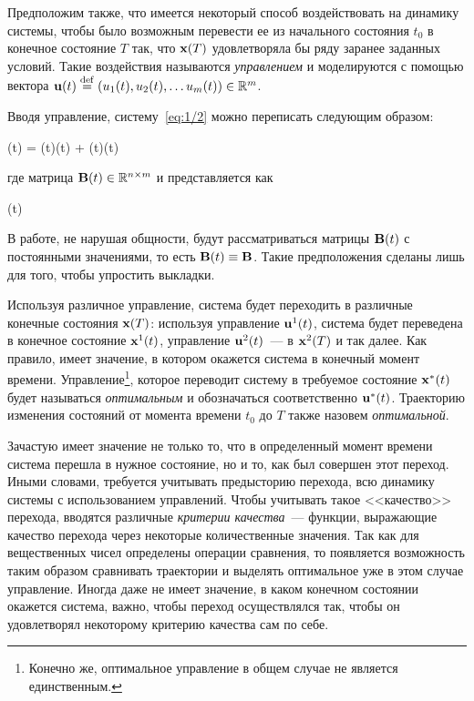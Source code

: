 Предположим также, что имеется некоторый способ воздействовать на динамику системы, чтобы было возможным перевести ее из начального состояния $t_0$ в конечное состояние $T$ так, что $\mathbf{x}(T)$ удовлетворяла бы ряду заранее заданных условий. Такие воздействия называются \emph{управлением} и моделируются с помощью вектора $\mathbf{u}(t) \stackrel{ \mathrm{def} }{=} (u_1(t), u_2(t), \ldots u_m(t)) \in \mathbb{R}^{m}$.

Вводя управление, систему~\ref{eq:1/2} можно переписать следующим образом:

	(t) = (t)(t) + (t)(t) \text{,}
\eeq

где матрица $\mathbf{B}(t) \in \mathbb{R}^{{n} \times {m}}$ и представляется как

\beqn
	(t) \eqdef {} 
\eeqn

В работе, не нарушая общности, будут рассматриваться матрицы $\mathbf{B}(t)$ с постоянными значениями, то есть $\mathbf{B}(t) \equiv \mathbf{B}$. Такие предположения сделаны лишь для того, чтобы упростить выкладки.

Используя различное управление, система будет переходить в различные конечные состояния $\mathbf{x}(T)$: используя управление $\mathbf{u}^1(t)$, система будет переведена в конечное состояние $\mathbf{x}^1(t)$, управление $\mathbf{u}^2(t)$~--- в $\mathbf{x}^2(T)$ и так далее. Как правило, имеет значение, в котором окажется система в конечный момент времени. Управление\footnote{Конечно же, оптимальное управление в общем случае не является единственным.}, которое переводит систему в требуемое состояние $\mathbf{x}^{*}(t)$ будет называться \emph{оптимальным} и обозначаться соответственно $\mathbf{u}^{*}(t)$. Траекторию изменения состояний от момента времени $t_0$ до $T$ также назовем \emph{оптимальной}.

\br

Зачастую имеет значение не только то, что в определенный момент времени система перешла в нужное состояние, но и то, как был совершен этот переход. Иными словами, требуется учитывать предысторию перехода, всю динамику системы с использованием управлений. Чтобы учитывать такое <<качество>> перехода, вводятся различные \emph{критерии качества}~--- функции, выражающие качество перехода через некоторые количественные значения. Так как для вещественных чисел определены операции сравнения, то появляется возможность таким образом сравнивать траектории и выделять оптимальное уже в этом случае управление. Иногда даже не имеет значение, в каком конечном состоянии окажется система, важно, чтобы переход осуществлялся так, чтобы он удовлетворял некоторому критерию качества сам по себе.

